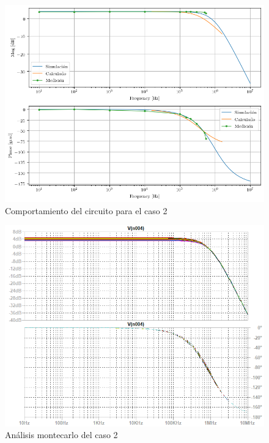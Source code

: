 \begin{figure}[H]
\begin{centering}
\includegraphics[scale=0.5]{../Ex1/iB/Resources1b/H2b}
\par\end{centering}
\caption{Comportamiento del circuito para el caso 2}
\end{figure}

\begin{figure}[H]
\begin{centering}
\includegraphics[scale=0.5]{../Ex1/iB/Resources1b/Montecarlo2}
\par\end{centering}
\caption{Análisis montecarlo del caso 2}
\end{figure}

